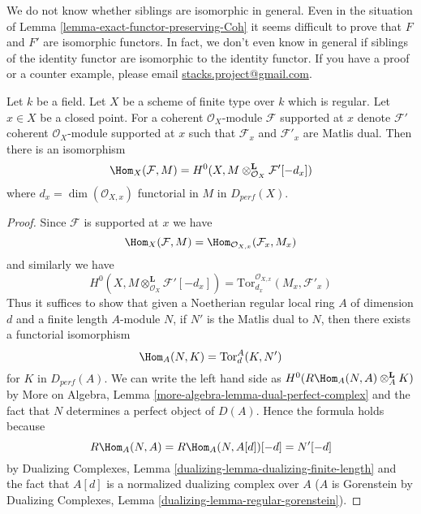\begin{remark}
\label{remark-difficult}
We do not know whether siblings are isomorphic in general.
Even in the situation of Lemma \ref{lemma-exact-functor-preserving-Coh}
it seems difficult to prove that $F$ and $F'$ are isomorphic functors.
In fact, we don't even know in general if siblings of the identity
functor are isomorphic to the identity functor.
If you have a proof or a counter example, please email
\href{mailto:stacks.project@gmail.com}{stacks.project@gmail.com}.
\end{remark}

\begin{lemma}
\label{lemma-duality-at-point}
Let $k$ be a field. Let $X$ be a scheme of finite type over $k$ which
is regular. Let $x \in X$ be a closed point. For a coherent
$\mathcal{O}_X$-module $\mathcal{F}$ supported at $x$ denote
$\mathcal{F}'$ coherent $\mathcal{O}_X$-module supported at $x$
such that $\mathcal{F}_x$ and $\mathcal{F}'_x$ are Matlis dual.
Then there is an isomorphism
$$
\Hom_X(\mathcal{F}, M) =
H^0(X, M \otimes_{\mathcal{O}_X}^\mathbf{L} \mathcal{F}'[-d_x])
$$
where $d_x = \dim(\mathcal{O}_{X, x})$
functorial in $M$ in $D_{perf}(X)$.
\end{lemma}

\begin{proof}
Since $\mathcal{F}$ is supported at $x$ we have
$$
\Hom_X(\mathcal{F}, M) =
\Hom_{\mathcal{O}_{X, x}}(\mathcal{F}_x, M_x)
$$
and similarly we have
$$
H^0(X, M \otimes_{\mathcal{O}_X}^\mathbf{L} \mathcal{F}'[-d_x]) =
\text{Tor}^{\mathcal{O}_{X, x}}_{d_x}(M_x, \mathcal{F}'_x)
$$
Thus it suffices to show that given a Noetherian regular local ring $A$
of dimension $d$ and a finite length $A$-module $N$, if
$N'$ is the Matlis dual to $N$, then there exists a functorial isomorphism
$$
\Hom_A(N, K) = \text{Tor}^A_d(K, N')
$$
for $K$ in $D_{perf}(A)$. We can write the left hand side as
$H^0(R\Hom_A(N, A) \otimes_A^\mathbf{L} K)$ by
More on Algebra, Lemma \ref{more-algebra-lemma-dual-perfect-complex}
and the fact that $N$ determines a perfect object of $D(A)$.
Hence the formula holds because
$$
R\Hom_A(N, A) = R\Hom_A(N, A[d])[-d] = N'[-d]
$$
by Dualizing Complexes, Lemma \ref{dualizing-lemma-dualizing-finite-length}
and the fact that $A[d]$ is a normalized dualizing complex over $A$
($A$ is Gorenstein by
Dualizing Complexes, Lemma \ref{dualizing-lemma-regular-gorenstein}).
\end{proof}

